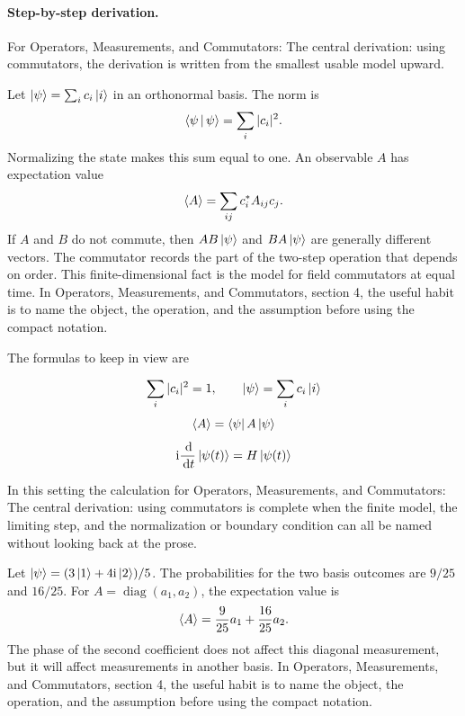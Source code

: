 \paragraph{Step-by-step derivation.}

For Operators, Measurements, and Commutators: The central derivation: using commutators, the derivation is written from the smallest usable model upward.

Let \(\left|\psi\right\rangle=\sum_i c_i\left|i\right\rangle\) in an orthonormal basis.  The norm is
\[
  \left\langle \psi\,\middle|\,\psi\right\rangle=\sum_i |c_i|^2.
\]
Normalizing the state makes this sum equal to one.  An observable \(A\) has expectation value
\[
  \left\langle A\right\rangle=\sum_{ij}c_i^*A_{ij}c_j.
\]
If \(A\) and \(B\) do not commute, then \(AB\left|\psi\right\rangle\) and \(BA\left|\psi\right\rangle\) are generally different vectors.  The commutator records the part of the two-step operation that depends on order.  This finite-dimensional fact is the model for field commutators at equal time.  In Operators, Measurements, and Commutators, section 4, the useful habit is to name the object, the operation, and the assumption before using the compact notation.

The formulas to keep in view are

\[
  \sum_i |c_i|^2=1,\qquad \left|\psi\right\rangle=\sum_i c_i\left|i\right\rangle
\]
\[
  \left\langle A\right\rangle=\left\langle \psi\right|A\left|\psi\right\rangle
\]
\[
  \mathrm i\frac{\,\mathrm d}{\,\mathrm d t}\left|\psi(t)\right\rangle=H\left|\psi(t)\right\rangle
\]

In this setting the calculation for Operators, Measurements, and Commutators: The central derivation: using commutators is complete when the finite model, the limiting step, and the normalization or boundary condition can all be named without looking back at the prose.




\begin{example}
Let \(\left|\psi\right\rangle=(3\left|1\right\rangle+4\mathrm i\left|2\right\rangle)/5\).  The probabilities for the two basis outcomes are \(9/25\) and \(16/25\).  For \(A=\operatorname{diag}(a_1,a_2)\), the expectation value is
\[
  \left\langle A\right\rangle=\frac{9}{25}a_1+\frac{16}{25}a_2.
\]
The phase of the second coefficient does not affect this diagonal measurement, but it will affect measurements in another basis.  In Operators, Measurements, and Commutators, section 4, the useful habit is to name the object, the operation, and the assumption before using the compact notation.
\end{example}



